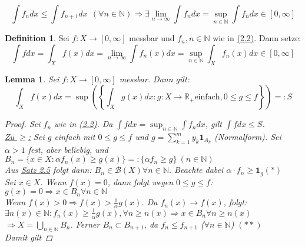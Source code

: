 \documentclass[a4paper]{report}
\newcommand{\doubleOne}{\textbf{1}}
\newcommand{\R}{\mathbb{R}}
\newcommand{\N}{\mathbb{N}}
\newcommand{\Borel}{\mathcal{B}}
\newcommand{\toInf}{\rightarrow \infty}
\newcommand{\limToInf}[1]{\lim_{#1 \toInf}}
\newcommand{\jlabel}[1]{\label{j_#1}}
\newcommand{\jhyperref}[2]{\hyperref[j_#1]{#2}}
\newcommand{\jlink}[1]{\jhyperref{#1}{#1}}
\theoremstyle{plain}
\newtheorem{lem}[thm]{Lemma}
\theoremstyle{definition}
\newtheorem{defn}[thm]{Definition}
\begin{document}
{{{\begin{displaymath}
    \int f_n dx \le \int f_{n+1} dx \ \ (\forall n \in \N)
    \Rightarrow \exists \limToInf{n} \int f_n dx = \sup_{n \in \N} \int f_n dx \in [0, \infty]
\end{displaymath}

\begin{defn}
\jlabel{Def 2.16}
    Sei $f: X \rightarrow [0,\infty]$ messbar und $f_n, n \in \N$ wie in \jlink{(2.2)}. Dann setze:
    \begin{displaymath}
        \int f dx = \int_X f(x) dx = \limToInf{n} \int f_n(x) dx = \sup_{n \in \N} \int_X f_n(x) dx \in [0,\infty]
    \end{displaymath}
\end{defn}

\begin{lem}
\jlabel{Lem 2.17}
    Sei $f: X \rightarrow [0, \infty]$ messbar. Dann gilt:
    \begin{displaymath}
        \int_X f(x) dx = \sup \left(\left\{\int_X g(x) dx : g: X \rightarrow \R_+ \text{einfach}, 0 \le g \le f\right\}\right) =: S
    \end{displaymath}
    \begin{proof}
        Sei $f_n$ wie in \jlink{(2.2)}. Da $\int f dx = \sup_{n \in \N} \int f_n dx$, gilt $\int f dx \le S$. \\
        \uline{Zu $\ge$:} Sei $g$ einfach mit $0 \le g \le f$ und $g = \sum_{k=1}^m y_k \doubleOne_{A_k}$ (Normalform). Sei $\alpha > 1$ fest, aber beliebig, und $B_n = \{x \in X : \alpha f_n(x) \ge g(x)\} =: \{\alpha f_n \ge g\} \ (n \in \N)$ \\
        Aus \jlink{Satz 2.5} folgt dann: $B_n \in \Borel(X) \forall n \in \N$. Beachte dabei $\alpha \cdot f_n \ge \doubleOne_g (*)$ \\
        Sei $x \in X$. Wenn $f(x) = 0$, dann folgt wegen $0 \le g \le f$: \\
        $g(x) = 0 \Rightarrow x \in B_n \forall n \in \N$ \\
        Wenn $f(x) > 0 \Rightarrow f(x) > \frac{1}{\alpha} g(x)$. Da $f_n(x) \rightarrow f(x)$, folgt: \\
        $\exists n(x) \in \N: f_n(x) \ge \frac{1}{\alpha} g(x), \forall n \ge n(x) \Rightarrow x \in B_n \forall n \ge n(x)$ \\
        $\Rightarrow X = \bigcup_{n \in \N} B_n$. Ferner $B_n \subset B_{n+1}$, da $f_n \le f_{n+1}$ ($\forall n \in \N$) $(**)$ \\
        Damit gilt

\end{proof}
\end{lem}}}}
\end{document}

